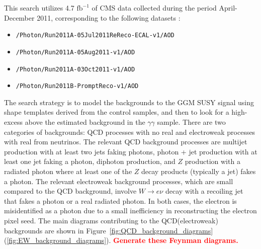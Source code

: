 \documentclass[dissertation.tex]{subfiles}
\begin{document}
This search utilizes 4.7 $\mbox{fb}^{-1}$ of CMS data collected during the period April-December 2011, corresponding to the following datasets \cite{DAS}:

\begin{itemize}
\item \verb+/Photon/Run2011A-05Jul2011ReReco-ECAL-v1/AOD+
\item \verb+/Photon/Run2011A-05Aug2011-v1/AOD+
\item \verb+/Photon/Run2011A-03Oct2011-v1/AOD+
\item \verb+/Photon/Run2011B-PromptReco-v1/AOD+
\end{itemize}

The search strategy is to model the backgrounds to the GGM SUSY signal using \MET shape templates derived from the control samples, and then to look for a high-\MET excess above the estimated background in the $\gamma\gamma$ sample.  There are two categories of backgrounds: QCD processes with no real \MET and electroweak processes with real \MET from neutrinos.  The relevant QCD background processes are multijet production with at least two jets faking photons, photon + jet production with at least one jet faking a photon, diphoton production, and $Z$ production with a radiated photon where at least one of the $Z$ decay products (typically a jet) fakes a photon.  The relevant electroweak background processes, which are small compared to the QCD background, involve $W\rightarrow e\nu$ decay with a recoiling jet that fakes a photon or a real radiated photon.  In both cases, the electron is misidentified as a photon due to a small inefficiency in reconstructing the electron pixel seed.  The main diagrams contributing to the QCD(electroweak) backgrounds are shown in Figure~\ref{fig:QCD_background_diagrams}(\ref{fig:EW_background_diagrams}).  \textcolor{red}{\textbf{Generate these Feynman diagrams.}}

%
\end{document}
